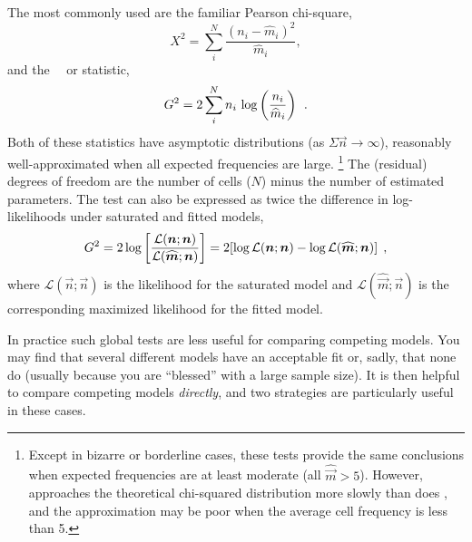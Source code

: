 \documentclass[11pt]{book}\usepackage[]{graphicx}\usepackage[]{color}
\begin{document}
The most commonly used are the familiar Pearson chi-square,
\begin{equation}\label{eq:pchi}
X^2 = \sum_i^N \frac{( n_i - \widehat{m}_i )^2}{\widehat{m}_i}
\comma
\end{equation}
and the \LR\ \GSQ\ or  statistic,
\begin{equation}\label{eq:pgsq}
G^2 =  2 \sum_i^N n_i \, \log \left( \frac{n_i} {\widehat{m}_i} \right)
\:\: .
\end{equation}
Both of these statistics have asymptotic \chisq
distributions (as $\Sigma \vec{n} \to \infty$), reasonably well-approximated
when all expected frequencies are large.%
\footnote{
Except in bizarre or borderline
cases, these tests provide the same conclusions when
expected frequencies are at least moderate (all $\widehat{\vec{m}} > 5$).
However, \GSQ approaches the theoretical chi-squared distribution
more slowly than does \chisq, and the approximation may be poor
when the average cell frequency is less than 5.
}
The (residual) degrees of freedom are the number of cells ($N$) minus the
number of estimated parameters.
The \LR test can also be expressed as twice the difference
in log-likelihoods under saturated and fitted models,
\begin{equation*}%
\GSQ =  2 \log \left[ \frac{\mathcal{L}(\vec{n}; \vec{n})}  {\mathcal{L}(\widehat{\vec{m}}; \vec{n})}
               \right]
     =  2 [ 
           \log \mathcal{L}(\vec{n}; \vec{n}) 
         - \log \mathcal{L}(\widehat{\vec{m}}; \vec{n})
          ]
\comma
\end{equation*}
where 
% 
$\mathcal{L}(\vec{n}; \vec{n})$ is the
likelihood for the saturated model and
$\mathcal{L}(\widehat{\vec{m}}; \vec{n})$ is the corresponding maximized likelihood
for the fitted model.


In practice such global tests are less useful for comparing competing models.
You may  find that several different models have an acceptable fit
or, sadly, that none do (usually because you are ``blessed'' with a
large sample size).
It is then helpful to compare competing models \emph{directly},
and two strategies are particularly useful in these cases.
\end{document}

